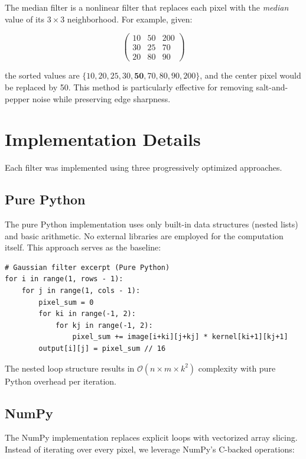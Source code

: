 \documentclass[12pt, a4paper]{article}
\begin{document}
The median filter is a nonlinear filter that replaces each pixel with the \textit{median} value of its $3 \times 3$ neighborhood. For example, given:

\[
\begin{pmatrix}
10 & 50 & 200 \\
30 & 25 & 70 \\
20 & 80 & 90
\end{pmatrix}
\]

the sorted values are $\{10, 20, 25, 30, \mathbf{50}, 70, 80, 90, 200\}$, and the center pixel would be replaced by 50. This method is particularly effective for removing salt-and-pepper noise while preserving edge sharpness.

\section{Implementation Details}

Each filter was implemented using three progressively optimized approaches.

\subsection{Pure Python}

The pure Python implementation uses only built-in data structures (nested lists) and basic arithmetic. No external libraries are employed for the computation itself. This approach serves as the baseline:

\begin{lstlisting}
# Gaussian filter excerpt (Pure Python)
for i in range(1, rows - 1):
    for j in range(1, cols - 1):
        pixel_sum = 0
        for ki in range(-1, 2):
            for kj in range(-1, 2):
                pixel_sum += image[i+ki][j+kj] * kernel[ki+1][kj+1]
        output[i][j] = pixel_sum // 16
\end{lstlisting}

The nested loop structure results in $\mathcal{O}(n \times m \times k^2)$ complexity with pure Python overhead per iteration.

\subsection{NumPy}

The NumPy implementation replaces explicit loops with vectorized array slicing. Instead of iterating over every pixel, we leverage NumPy's C-backed operations:
\end{document}
